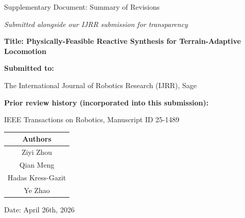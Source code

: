 \begin{titlepage}
\centering
{\LARGE Supplementary Document: Summary of Revisions \par}
\vspace{0.6cm}
{\large \textit{Submitted alongside our IJRR submission for transparency}}
\vskip 1.5cm

{\large \bfseries Title: Physically-Feasible Reactive Synthesis for Terrain-Adaptive Locomotion \par}
\vspace{1cm}

{\large \bfseries Submitted to: \par
The International Journal of Robotics Research (IJRR), Sage}
\vspace{1.5cm}

{\large \bfseries Prior review history (incorporated into this submission):\par
IEEE Transactions on Robotics, Manuscript ID 25-1489 \\}
\vspace{1.5cm}

\begin{table}[h!]
\renewcommand{\arraystretch}{1}
\centering
\begin{tabular}{c}
\large \bfseries Authors\\
\hline
\large Ziyi Zhou \\
\large Qian Meng \\
\large Hadas Kress-Gazit \\
\large Ye Zhao \\
\end{tabular}
\end{table}
\vspace{1.5cm}
\large Date: April 26th, 2026
\end{titlepage}
